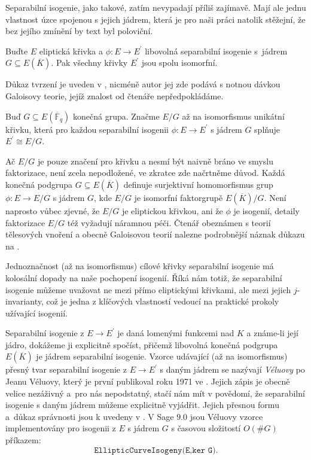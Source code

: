 \documentclass[12pt]{report}
\begin{document}
Separabilní isogenie, jako takové, zatím nevypadají příliš zajímavě. Mají ale jednu vlastnost úzce spojenou s jejich jádrem, která je pro naši práci natolik stěžejní, že bez jejího zmínění by text byl poloviční.

\begin{veta}\label{isomor}
Buďte $E$ eliptická křivka a $\phi : E \longrightarrow E^\prime$ libovolná separabilní isogenie s~jádrem $G \subseteq E(\overline{K})$. Pak všechny křivky $E^\prime$ jsou spolu isomorfní.
\end{veta}
Důkaz tvrzení je uveden v \cite[Prop. 12.12]{Washington}, nicméně autor jej zde podává s notnou dávkou Galoisovy teorie, jejíž znalost od čtenáře nepředpokládáme.

\begin{znaceni}
Buď $G \subseteq E(\overline{\mathbb{F}}_q)$ konečná grupa. Značme $E/G$ až na isomorfismus unikátní křivku, která pro každou separabilní isogenii $\phi : E \longrightarrow E^\prime$ s jádrem $G$ splňuje $E^\prime \cong E/G$.
\end{znaceni}

\begin{poznamka}
Ač $E/G$ je pouze značení pro křivku a nesmí být naivně bráno ve smyslu faktorizace, není zcela nepodložené, ve zkratce zde načrtněme důvod. Každá konečná podgrupa $G \subseteq E(\overline{K})$ definuje surjektivní homomorfismus grup $\phi : E \longrightarrow E/G$ s jádrem $G$, kde $E/G$ je isomorfní faktorgrupě $E(\overline{K})/G$. Není naprosto vůbec zjevné, že $E/G$ je eliptickou křivkou, ani že $\phi$ je isogenií, detaily faktorizace $E/G$ též vyžadují náramnou péči. Čtenář obeznámen s teorií tělesových vnoření a obecně Galoisovou teorií nalezne podrobnější náznak důkazu na \cite[Thm. 6.10.]{Sutherland}.
\end{poznamka}

Jednoznačnost (až na isomorfismus) cílové křivky separabilní isogenie má kolosální dopady na naše pochopení isogenií. Říká nám totiž, že separabilní isogenie můžeme uvažovat ne mezi přímo eliptickými křivkami, ale mezi jejich $j$-invarianty, což je jedna z klíčových vlastností vedoucí na praktické prokoly užívající isogenií.

Separabilní isogenie z $E \longrightarrow E^\prime$ je daná lomenými funkcemi nad $K$ a známe-li její jádro, dokážeme ji explicitně spočíst, přičemž libovolná konečná podgrupa $E(\overline{K})$ je jádrem separabilní isogenie. Vzorce udávající (až na isomorfismus) přesný tvar separabilní isogenie z $E \longrightarrow E^\prime$ s daným jádrem se nazývají \textit{Véluovy} po Jeanu Véluovy, který je první publikoval roku 1971 ve \cite{Velu}. Jejich zápis je obecně velice nezáživný a~pro nás nepodstatný, stačí nám mít v povědomí, že separabilní isogenie s daným jádrem můžeme explicitně vyjádřit. Jejich přesnou formu a~důkaz správnosti jsou k uvedeny v \cite[Ch.~8.2]{DeFeo}. V Sage $9.0$ jsou Véluovy vzorce implementovány pro isogenii z $E$ s jádrem $G$ s časovou složitostí $O(\# G)$ příkazem:
\begin{equation*}
\texttt{EllipticCurveIsogeny(E,ker G)}.
\end{equation*}
\end{document}
